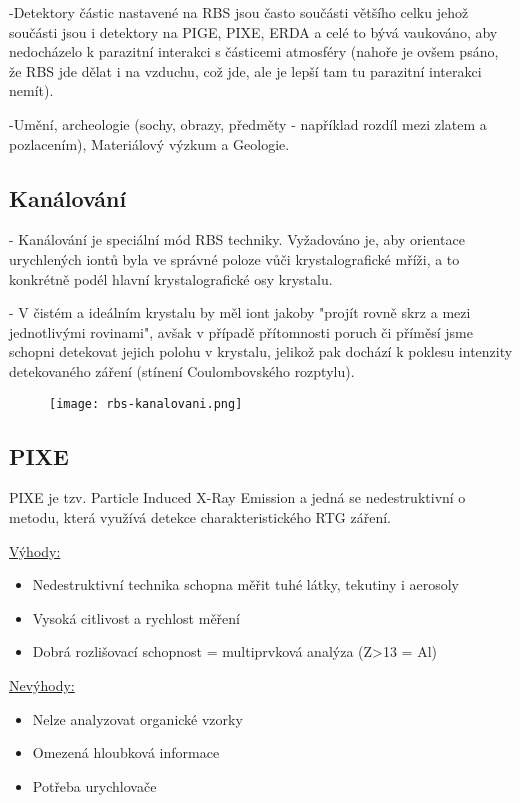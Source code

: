 -Detektory částic nastavené na RBS jsou často součásti většího celku jehož součásti jsou i detektory na PIGE, PIXE, ERDA a celé to bývá vaukováno, aby nedocházelo k parazitní interakci s částicemi atmosféry (nahoře je ovšem psáno, že RBS jde dělat i na vzduchu, což jde, ale je lepší tam tu parazitní interakci nemít).

-Umění, archeologie (sochy, obrazy, předměty - například rozdíl mezi zlatem a pozlacením), Materiálový výzkum a Geologie.

\subsection{Kanálování}

- Kanálování je speciální mód RBS techniky. Vyžadováno je, aby orientace urychlených iontů byla ve správné poloze vůči krystalografické mříži, a to konkrétně podél hlavní krystalografické osy krystalu.

- V čistém a ideálním krystalu by měl iont jakoby "projít rovně skrz  a mezi jednotlivými rovinami", avšak v případě přítomnosti poruch či příměsí jsme schopni detekovat jejich polohu v krystalu, jelikož pak dochází k poklesu intenzity detekovaného záření (stínení Coulombovského rozptylu).

\begin{figure}[ht!]
	\texttt{[image: rbs-kanalovani.png]}
\end{figure}

\subsection{PIXE}
PIXE je tzv. Particle Induced X-Ray Emission a jedná se nedestruktivní o metodu, která využívá detekce charakteristického RTG záření.

\underline{Výhody:}
\begin{itemize}
    \item Nedestruktivní technika schopna měřit tuhé látky, tekutiny i aerosoly
    \item Vysoká citlivost a rychlost měření
    \item Dobrá rozlišovací schopnost = multiprvková analýza (Z>13 = Al)
\end{itemize}

\underline{Nevýhody:}
\begin{itemize}
    \item Nelze analyzovat organické vzorky
    \item Omezená hloubková informace
    \item Potřeba urychlovače
\end{itemize}

